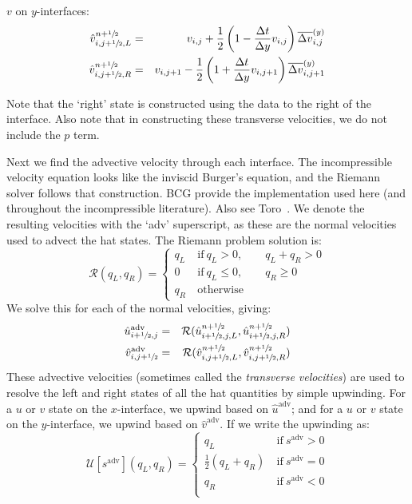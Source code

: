 \noindent $v$ on $y$-interfaces:
\begin{eqnarray}
\hat{v}_{i,j+\myhalf,L}^{n+\myhalf} &=&
   v_{i,j} + \frac{1}{2} \left ( 1 - \frac{\Delta t}{\Delta y} v_{i,j} \right )
       \Dvy_{i,j} \\ 
%
\hat{v}_{i,j+\myhalf,R}^{n+\myhalf} &=&
   v_{i,j+1} - \frac{1}{2} \left ( 1 + \frac{\Delta t}{\Delta y} v_{i,j+1} \right )
       \Dvy_{i,j+1} 
\end{eqnarray}

Note that the `right' state is constructed using the data to the right
of the interface.  Also note that in constructing these transverse
velocities, we do not include the $p$ term.

Next we find the advective velocity through each interface.  
The incompressible
velocity equation looks like the inviscid Burger's equation, and the
Riemann solver follows that construction.  BCG provide the implementation
used here (and throughout the incompressible literature).  Also see Toro~\cite{toro:1997}.
We denote the resulting velocities with the `adv' superscript, as these
are the normal velocities used to advect the hat states.  The Riemann
problem solution is:
\begin{equation}
\mathcal{R}(q_L,q_R) = \left \{ \begin{array}{cl}
   q_L  & \mathrm{~if~} q_L > 0, \qquad q_L + q_R > 0 \\
   0          & \mathrm{~if~} q_L \le 0, \qquad q_R \ge 0 \\
   q_R  & \mathrm{~otherwise}
  \end{array}
  \right .
\end{equation}
We solve this for each of the normal velocities, giving:
\begin{eqnarray}
\hat{u}^\mathrm{adv}_{i+\myhalf,j} &=& 
    \mathcal{R}(\hat{u}_{i+\myhalf,j,L}^{n+\myhalf}, \hat{u}_{i+\myhalf,j,R}^{n+\myhalf}) \\
%
\hat{v}^\mathrm{adv}_{i,j+\myhalf} &=& 
    \mathcal{R}(\hat{v}_{i,j+\myhalf,L}^{n+\myhalf}, \hat{v}_{i,j+\myhalf,R}^{n+\myhalf})
\end{eqnarray}
These advective velocities (sometimes called the {\em transverse
  velocities}) are used to resolve the left and right states of all the
hat quantities by simple upwinding.  For a $u$ or $v$ state on the
$x$-interface, we upwind based on $\hat{u}^\mathrm{adv}$; and for a
$u$ or $v$ state on the $y$-interface, we upwind based on
$\hat{v}^\mathrm{adv}$.  If we write the upwinding as:
\begin{equation}
\mathcal{U}[s^\mathrm{adv}](q_L, q_R) =
  \left \{
  \begin{array}{cl}
  q_L                    & \mathrm{~if~} s^\mathrm{adv} > 0 \\
  \frac{1}{2}(q_L + q_R) & \mathrm{~if~} s^\mathrm{adv} = 0 \\
  q_R                    & \mathrm{~if~} s^\mathrm{adv} < 0 \\
  \end{array}
  \right .
\end{equation}

